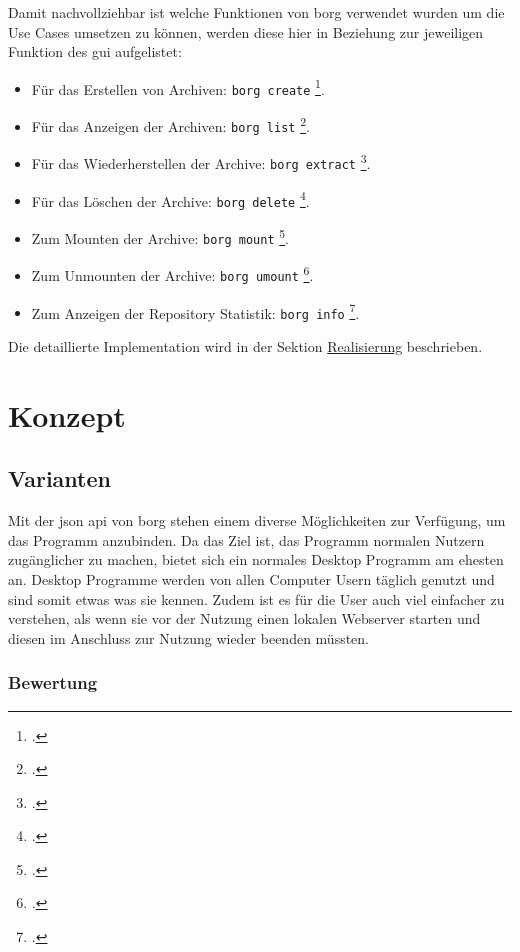 Damit nachvollziehbar ist welche Funktionen von \gls{borg} verwendet wurden um
die Use Cases umsetzen zu können, werden diese hier in Beziehung zur
jeweiligen Funktion des \gls{gui} aufgelistet:
\begin{itemize}
\item Für das Erstellen von Archiven: \texttt{borg create} \footcite{borgcreate}.
\item Für das Anzeigen der Archiven: \texttt{borg list} \footcite{borglist}.
\item Für das Wiederherstellen der Archive: \texttt{borg extract} \footcite{borgextract}.
\item Für das Löschen der Archive: \texttt{borg delete} \footcite{borgdelete}.
\item Zum Mounten der Archive: \texttt{borg mount} \footcite{borgmount}.
\item Zum Unmounten der Archive: \texttt{borg umount} \footcite{borgumount}.
\item Zum Anzeigen der Repository Statistik: \texttt{borg info} \footcite{borginfo}.
\end{itemize}

Die detaillierte Implementation wird in der Sektion \hyperref[sec:orgb833f22]{Realisierung} beschrieben.

\section{Konzept}
\label{sec:org3462c4c}

\subsection{Varianten}
\label{sec:org44227c4}

Mit der \gls{json} \gls{api} von \gls{borg} stehen einem diverse Möglichkeiten zur
Verfügung, um das Programm anzubinden. Da das Ziel ist, das Programm normalen
Nutzern zugänglicher zu machen, bietet sich ein normales Desktop Programm am
ehesten an. Desktop Programme werden von allen Computer Usern täglich genutzt
und sind somit etwas was sie kennen. Zudem ist es für die User auch viel
einfacher zu verstehen, als wenn sie vor der Nutzung einen lokalen Webserver
starten und diesen im Anschluss zur Nutzung wieder beenden müssten.

\subsubsection{Bewertung}
\label{sec:orgcdfcad2}

